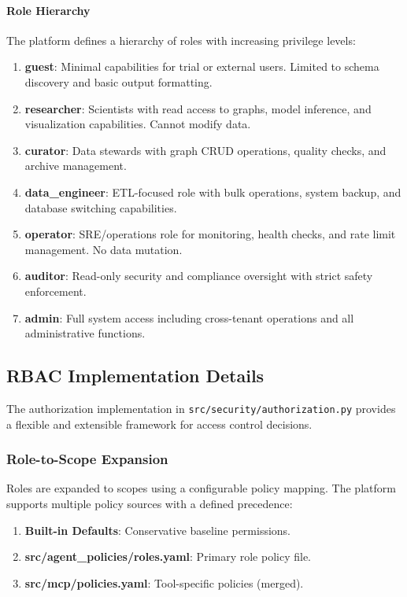 \paragraph{Role Hierarchy}
The platform defines a hierarchy of roles with increasing privilege levels:

\begin{enumerate}
    \item \textbf{guest}: Minimal capabilities for trial or external users. Limited to schema discovery and basic output formatting.
    \item \textbf{researcher}: Scientists with read access to graphs, model inference, and visualization capabilities. Cannot modify data.
    \item \textbf{curator}: Data stewards with graph CRUD operations, quality checks, and archive management.
    \item \textbf{data\_engineer}: ETL-focused role with bulk operations, system backup, and database switching capabilities.
    \item \textbf{operator}: SRE/operations role for monitoring, health checks, and rate limit management. No data mutation.
    \item \textbf{auditor}: Read-only security and compliance oversight with strict safety enforcement.
    \item \textbf{admin}: Full system access including cross-tenant operations and all administrative functions.
\end{enumerate}

\subsection{RBAC Implementation Details}
\label{subsec:rbac-implementation}

The authorization implementation in \texttt{src/security/authorization.py} provides a flexible and extensible framework for access control decisions.

\subsubsection{Role-to-Scope Expansion}

Roles are expanded to scopes using a configurable policy mapping. The platform supports multiple policy sources with a defined precedence:

\begin{enumerate}
    \item \textbf{Built-in Defaults}: Conservative baseline permissions.
    \item \textbf{src/agent\_policies/roles.yaml}: Primary role policy file.
    \item \textbf{src/mcp/policies.yaml}: Tool-specific policies (merged).
\end{enumerate}


